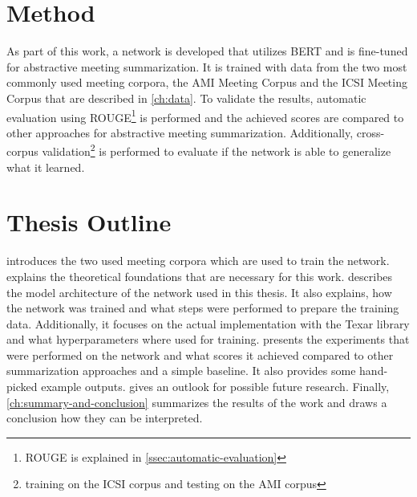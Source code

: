 
\section{Method}

As part of this work, a network is developed that utilizes BERT and is fine-tuned for abstractive meeting summarization.
It is trained with data from the two most commonly used meeting corpora, the AMI Meeting Corpus \cite{Mccowan05theami} and the ICSI Meeting Corpus \cite{Janin} that are described in \cref{ch:data}.
To validate the results, automatic evaluation using ROUGE\footnote{ROUGE is explained in \cref{ssec:automatic-evaluation}} is performed and the achieved scores are compared to other approaches for abstractive meeting summarization.
Additionally, cross-corpus validation\footnote{\Eg training on the ICSI corpus and testing on the AMI corpus} is performed to evaluate if the network is able to generalize what it learned.


\section{Thesis Outline}

 introduces the two used meeting corpora which are used to train the network.
 explains the theoretical foundations that are necessary for this work.
 describes the model architecture of the network used in this thesis.
It also explains, how the network was trained and what steps were performed to prepare the training data.
Additionally, it focuses on the actual implementation with the Texar library \cite{hu2019texar} and what hyperparameters where used for training.
 presents the experiments that were performed on the network and what scores it achieved compared to other summarization approaches and a simple baseline.
It also provides some hand-picked example outputs.
 gives an outlook for possible future research.
Finally, \cref{ch:summary-and-conclusion} summarizes the results of the work and draws a conclusion how they can be interpreted.
